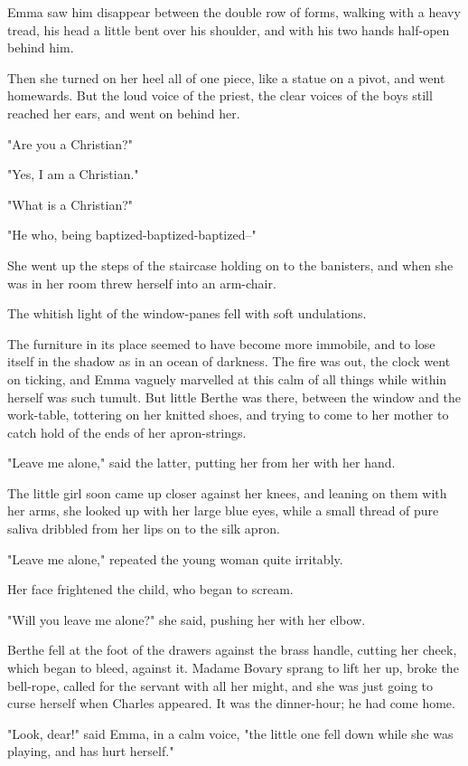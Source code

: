 \documentclass[11pt,twocolumn]{ltugboat}
\begin{document}
Emma saw him disappear between the double row of forms, walking with a
heavy tread, his head a little bent over his shoulder, and with his two
hands half-open behind him.

Then she turned on her heel all of one piece, like a statue on a pivot,
and went homewards. But the loud voice of the priest, the clear voices
of the boys still reached her ears, and went on behind her.

"Are you a Christian?"

"Yes, I am a Christian."

"What is a Christian?"

"He who, being baptized-baptized-baptized--"

She went up the steps of the staircase holding on to the banisters, and
when she was in her room threw herself into an arm-chair.

The whitish light of the window-panes fell with soft undulations.

The furniture in its place seemed to have become more immobile, and to
lose itself in the shadow as in an ocean of darkness. The fire was out,
the clock went on ticking, and Emma vaguely marvelled at this calm of
all things while within herself was such tumult. But little Berthe was
there, between the window and the work-table, tottering on her knitted
shoes, and trying to come to her mother to catch hold of the ends of her
apron-strings.

"Leave me alone," said the latter, putting her from her with her hand.

The little girl soon came up closer against her knees, and leaning on
them with her arms, she looked up with her large blue eyes, while a
small thread of pure saliva dribbled from her lips on to the silk apron.

"Leave me alone," repeated the young woman quite irritably.

Her face frightened the child, who began to scream.

"Will you leave me alone?" she said, pushing her with her elbow.

Berthe fell at the foot of the drawers against the brass handle, cutting
her cheek, which began to bleed, against it. Madame Bovary sprang to
lift her up, broke the bell-rope, called for the servant with all her
might, and she was just going to curse herself when Charles appeared. It
was the dinner-hour; he had come home.

"Look, dear!" said Emma, in a calm voice, "the little one fell down
while she was playing, and has hurt herself."
\end{document}
